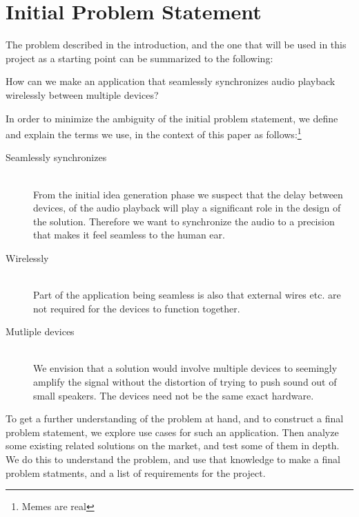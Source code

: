 \section{Initial Problem Statement}\label{sec:initial_problem}

The problem described in the introduction, and the one that will be used
in this project as a starting point can be summarized to the following:

\begin{problemstatement}
    How can we make an application that seamlessly synchronizes audio
    playback wirelessly between multiple devices?
\end{problemstatement}

\noindent
In order to minimize the ambiguity of the initial problem statement,
we define and explain the terms we use, in the context of this paper as follows:\footnote{Memes are real}

\begin{description}
    \item[Seamlessly synchronizes]  \hfill \\
        From the initial idea generation phase we suspect
        that the delay between devices, of the audio playback will
        play a significant role in the design of the solution. Therefore we
        want to synchronize the audio to a precision that makes it feel
        seamless to the human ear.
    \item[Wirelessly]  \hfill \\
        Part of the application being seamless is also that external wires etc. are
        not required for the devices to function together.
    \item[Mutliple devices]  \hfill \\
        We envision that a solution would involve multiple devices to seemingly
        amplify the signal without the distortion of trying to push sound out of
        small speakers. The devices need not be the same exact hardware.
\end{description}

To get a further understanding of the problem at hand, and to
construct a final problem statement, we explore use
cases for such an application.
Then analyze some existing related solutions on the market,
and test some of them in depth.
We do this to understand the problem, and use that knowledge
to make a final problem statments, and a list of requirements for the project.
